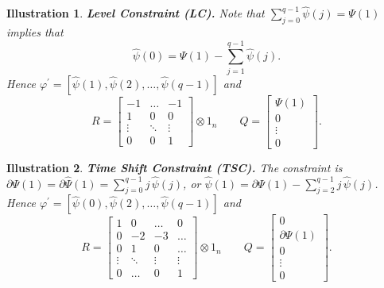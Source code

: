 \documentclass[a4paper]{book}
\newtheorem{Illustration}{Illustration}
\begin{document}
\begin{Illustration}  {\bf Level Constraint (LC).}   \rm
\label{ill:lc}
 Note that $\sum_{j=0}^{q-1} \widehat{\psi} (j) = \Psi(1)$ implies that
\begin{equation}
\label{eq:lc-gamma0}
 \widehat{\psi} (0) = \Psi(1) - \sum_{j=1}^{q-1} \widehat{\psi} (j).
\end{equation}
 Hence  $ \varphi^{\prime}  = [ \widehat{\psi} (1), \widehat{\psi} (2), \ldots, \widehat{\psi} (q-1) ] $ and
\[
	R  = \left[ \begin{array}{ccc} -1 & \ldots & -1 \\ 1 & 0 & 0 \\
		\vdots & \ddots & \vdots \\ 0 & 0 & 1  \end{array} \right]  \otimes 1_n \qquad
	Q = \left[ \begin{array}{c} \Psi (1) \\ 0 \\ \vdots \\ 0 \end{array} \right].
\]
\end{Illustration}
 
 
\begin{Illustration}  {\bf Time Shift Constraint (TSC).}   \rm
\label{ill:tsc}
   The constraint is $\partial {\Psi} (1) = \partial \widehat{\Psi} (1)
   = \sum_{j=0}^{q-1} j \, \widehat{\psi} (j)$,
 or $\widehat{\psi} (1)  = \partial {\Psi} (1)  -  \sum_{j=2}^{q-1} j \, \widehat{\psi} (j) $.
 Hence  $ \varphi^{\prime}  = [ \widehat{\psi} (0), \widehat{\psi} (2), \ldots, \widehat{\psi} (q-1) ] $ and
\[
	R  = \left[ \begin{array}{cccc} 1 & 0 &  \ldots &  0  \\  0 & -2  &  -3  & \ldots  \\
		0 & 1 & 0 & \ldots \\ 
		\vdots & \ddots & \vdots & \vdots \\ 0 & \ldots & 0 & 1 \end{array} \right] \otimes 1_n \qquad
	Q = \left[ \begin{array}{c} 0 \\ \partial {\Psi} (1) \\ 0 \\ \vdots \\ 0 \end{array} \right].
\]
\end{Illustration}
 
\end{document}
